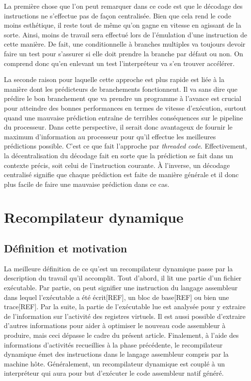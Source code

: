 \documentclass{article} %
\begin{document}
La première chose que l'on peut remarquer dans ce code est que le décodage des instructions ne s'effectue pas de façon centralisée. Bien que cela rend le code moins esthétique, il reste tout de même qu'on gagne en vitesse en agissant de la sorte. Ainsi, moins de travail sera effectué lors de l'émulation d'une instruction de cette manière. De fait, une conditionnelle à branches multiples va toujours devoir faire un test pour s'assurer si elle doit prendre la branche par défaut ou non. On comprend donc qu'en enlevant un test l'interpréteur va s'en trouver accélérer.

La seconde raison pour laquelle cette approche est plus rapide est liée à la manière dont les prédicteurs de branchements fonctionnent. Il va sans dire que prédire le bon branchement que va prendre un programme à l'avance est crucial pour atteindre des bonnes performances en termes de vitesse d'exécution, surtout quand une mauvaise prédiction entraîne de terribles conséquences sur le pipeline du processeur. Dans cette perspective, il serait donc avantageux de fournir le maximum d'information au processeur pour qu'il effectue les meilleures prédictions possible. C'est ce que fait l'approche par \textit{threaded code}. Effectivement, la décentralisation du décodage fait en sorte que la prédiction se fait dans un contexte précis, soit celui de l'instruction courante. À l'inverse, un décodage centralisé signifie que chaque prédiction est faite de manière générale et il donc plus facile de faire une mauvaise prédiction dans ce cas.

\section{Recompilateur dynamique}
\subsection{Définition et motivation}
La meilleure définition de ce qu'est un recompilateur dynamique passe par la description du travail qu'il accomplit. Tout d'abord, il lit une partie d'un fichier exécutable. Par partie, on peut signifier une instruction du langage assembleur dans lequel l'exécutable a été écrit[REF], un bloc de base[REF] ou bien une trace[REF]. Par la suite, la partie de l'exécutable lue est analysée pour y extraire de l'information sur l'activité des registres virtuels. Il est aussi possible d'extraire d'autres informations pour aider à optimiser le nouveau code assembleur à produire, mais ceci dépasse le cadre du présent article. Finalement, à l'aide des informations d'activités recueillies à la phase précédente, le recompilateur dynamique émet des instructions dans le langage assembleur compris par la machine hôte. Généralement, un recompilateur dynamique est couplé à un interpréteur qui aura pour but d'exécuter le code assembleur natif généré.
\end{document}
